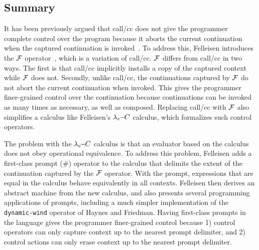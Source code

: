 \documentclass[letterpaper]{llncs}
\begin{document}

\subsection*{Summary}
It has been previously argued that call/cc does not give the programmer complete control over the program because it aborts the current continuation when the captured continuation is invoked~\cite{Felleisen1987SyntacticTheory}. To address this, Felleisen introduces the $ \mathcal{F} $ operator~\cite{Felleisen1987Beyond}, which is a variation of call/cc. $ \mathcal{F} $ differs from call/cc in two ways. The first is that call/cc implicitly installs a copy of the captured context while $ \mathcal{F} $ does not. Secondly, unlike call/cc, the continuations captured by $ \mathcal{F} $ do not abort the current continuation when invoked. This gives the programmer finer-grained control over the continuation because continuations can be invoked as many times as necessary, as well as composed. Replacing call/cc with $ \mathcal{F} $ also simplifies a calculus like Felleisen's $ \lambda_v\!\!-\!\!C $ calculus, which formalizes such control operators.

The problem with the $ \lambda_v\!\!-\!\!C $ calculus is that an evaluator based on the calculus does not obey operational equivalence. To address this problem, Felleisen adds a first-class prompt (\#) operator to the calculus that delimits the extent of the continuation captured by the $ \mathcal{F} $ operator. With the prompt, expressions that are equal in the calculus behave equivalently in all contexts. Felleisen then derives an abstract machine from the new calculus, and also presents several programming applications of prompts, including a much simpler implementation of the \texttt{dynamic-wind} operator of Haynes and Friedman. Having first-class prompts in the language gives the programmer finer-grained control because 1) control operators can only capture context up to the nearest prompt delimiter, and 2) control actions can only erase context up to the nearest prompt delimiter.
\end{document}
